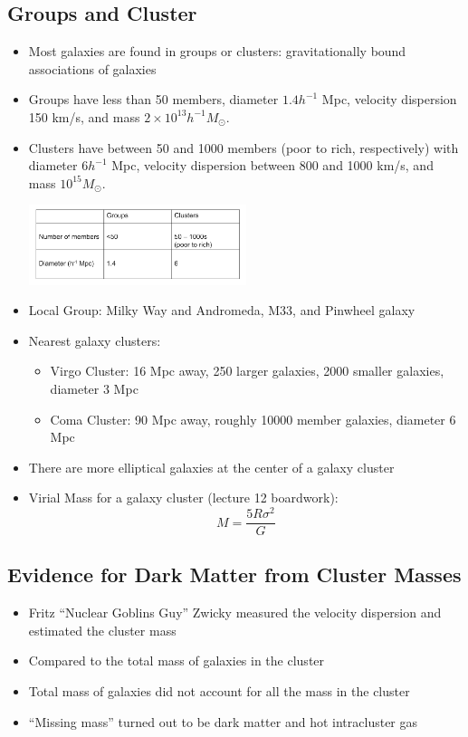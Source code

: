 \documentclass{book}
\begin{document}
\subsection{Groups and Cluster}
\begin{itemize}
    \item Most galaxies are found in groups or clusters: gravitationally bound associations of galaxies
    \item Groups have less than 50 members, diameter $1.4 h^{-1}$ Mpc, velocity dispersion 150 km/s, and mass $2 \times 10^{13} h^{-1} M_\odot$.
    \item Clusters have between 50 and 1000 members (poor to rich, respectively) with diameter $6 h^{-1}$ Mpc, velocity dispersion between 800 and 1000 km/s, and mass $10^{15} M_\odot$.
          \begin{center}
              \includegraphics[width=0.5\textwidth]{images/table.png}
          \end{center}
    \item Local Group: Milky Way and Andromeda, M33, and Pinwheel galaxy
    \item Nearest galaxy clusters:
          \begin{itemize}
              \item Virgo Cluster: 16 Mpc away, 250 larger galaxies, 2000 smaller galaxies, diameter 3 Mpc
              \item Coma Cluster: 90 Mpc away, roughly 10000 member galaxies, diameter 6 Mpc
          \end{itemize}
    \item There are more elliptical galaxies at the center of a galaxy cluster
    \item Virial Mass for a galaxy cluster (lecture 12 boardwork): $$M = \frac{5 R \sigma^2}{G}$$
\end{itemize}
\subsection{Evidence for Dark Matter from Cluster Masses}
\begin{itemize}
    \item Fritz ``Nuclear Goblins Guy'' Zwicky measured the velocity dispersion and estimated the cluster mass
    \item Compared to the total mass of galaxies in the cluster
    \item Total mass of galaxies did not account for all the mass in the cluster
    \item ``Missing mass'' turned out to be dark matter and hot intracluster gas
\end{itemize}
\end{document}
